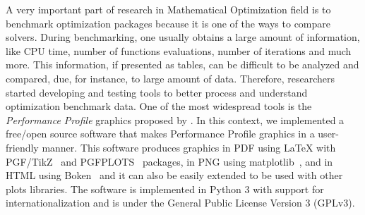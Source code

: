 A very important part of research in Mathematical Optimization field is to benchmark
optimization packages because it is one of the ways to compare
solvers.
During benchmarking, one usually
obtains a large amount of information, like CPU time, number of functions
evaluations, number of iterations and much more. This information, if
presented as tables, can be difficult to be analyzed and compared, due, for instance, to
large amount of data.  Therefore, researchers started developing and testing
tools to better process and understand optimization benchmark data. One of
the most widespread tools  is the \emph{Performance Profile} graphics proposed by
\textcite{Dolan:2002du}. In this context, we implemented a free/open source software
that makes Performance Profile graphics in a user-friendly manner. This software produces graphics in PDF using LaTeX with
PGF/TikZ~\cite{TikZ} and PGFPLOTS~\cite{pgfplots} packages, in
PNG using matplotlib~\cite{Hunter:2007}, and in HTML using
Boken~\cite{url:bokeh} and it can also be easily
extended to be used with other plots libraries. The software is implemented
in Python 3 with support for internationalization and is under the General
Public License Version 3 (GPLv3).
